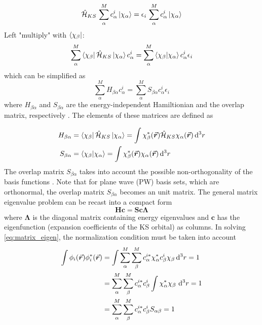 \begin{equation}\label{eq:KS_basis}
	\hat{\mathcal{H}}_{KS}\,  \sum^M_\alpha c^i_\alpha \ket{\chi_\alpha} = \epsilon_i\,  \sum^M_\alpha c^i_\alpha \ket{\chi_\alpha}
\end{equation}
Left "multiply" with  $\bra{\chi_\beta}$:
\begin{equation}
    \sum^M_\alpha  \bra{\chi_\beta} \hat{\mathcal{H}}_{KS} \ket{\chi_\alpha} c^i_\alpha = \sum^M_\alpha \braket{\chi_\beta}{\chi_\alpha} c^i_\alpha \epsilon_i
\end{equation}
which can be simplified as 
\begin{equation}
    \sum^M_\alpha  H_{\beta\alpha} c^i_\alpha = \sum^M_\alpha S_{\beta\alpha} c^i_\alpha \epsilon_i
\end{equation}
where $ H_{\beta\alpha}$ and $S_{\beta\alpha}$ are the energy-independent Hamiltionian and the overlap matrix, respectively \citep{Kohanoff2006}. The elements of these matrices are defined as 

\begin{align}
    H_{\beta\alpha} &= \bra{\chi_\beta} \hat{\mathcal{H}}_{KS} \ket{\chi_\alpha} = \int \chi^*_\beta(\va*{r}) \hat{\mathcal{H}}_{KS}\chi_\alpha(\va*{r}) \dd[3]{r}\\
    S_{\beta\alpha} &= \braket{\chi_\beta}{\chi_\alpha} = \int \chi^*_\beta(\va*{r}) \chi_\alpha(\va*{r}) \dd[3]{r}
\end{align}
The overlap matrix $S_{\beta\alpha}$ takes into account the possible non-orthogonality of the basis functions \citep{Woods2019}. Note that for plane wave (PW) basis sets, which are orthonormal, the overlap matrix $S_{\beta\alpha}$ becomes an unit matrix. The general matrix eigenvalue problem can be recast into a compact form \citep{Requist2008}
\begin{equation} \label{eq:matrix_eigen}
    \bm{H c =  S c \Lambda}
\end{equation}
where $\bm{\Lambda}$ is the diagonal matrix containing energy eigenvalues and  $\bm{c}$ has the eigenfunction (expansion coefficients of the KS orbital) as columns. In solving \eqref{eq:matrix_eigen}, the normalization condition must be taken into account
\begin{align} 
   \int \phi_i(\va*{r}) \phi^*_i(\va*{r}) &= \int \sum^M_\alpha \sum^M_\beta c^{i*}_\alpha \chi^*_\alpha c^i_\beta \chi_\beta \dd[3]{r} = 1 \\
   &= \sum^M_\alpha \sum^M_\beta c^{i*}_\alpha c^i_\beta \int \chi^*_\alpha  \chi_\beta\, \dd[3]{r} = 1 \\
   &= \sum^M_\alpha \sum^M_\beta c^{i*}_\alpha c^i_\beta S_{\alpha\beta} = 1 \label{eq:orbital_norm}
\end{align}

